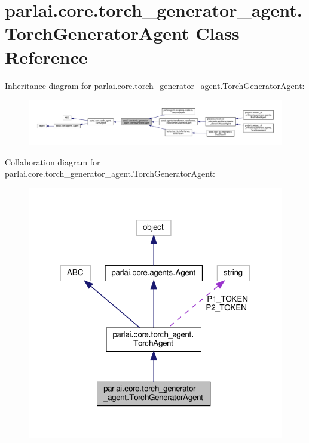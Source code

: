 \hypertarget{classparlai_1_1core_1_1torch__generator__agent_1_1TorchGeneratorAgent}{}\section{parlai.\+core.\+torch\+\_\+generator\+\_\+agent.\+Torch\+Generator\+Agent Class Reference}
\label{classparlai_1_1core_1_1torch__generator__agent_1_1TorchGeneratorAgent}


Inheritance diagram for parlai.\+core.\+torch\+\_\+generator\+\_\+agent.\+Torch\+Generator\+Agent\+:
\nopagebreak
\begin{figure}[H]
\begin{center}
\leavevmode
\includegraphics[width=350pt]{df/d9f/classparlai_1_1core_1_1torch__generator__agent_1_1TorchGeneratorAgent__inherit__graph}
\end{center}
\end{figure}


Collaboration diagram for parlai.\+core.\+torch\+\_\+generator\+\_\+agent.\+Torch\+Generator\+Agent\+:
\nopagebreak
\begin{figure}[H]
\begin{center}
\leavevmode
\includegraphics[width=318pt]{d5/d12/classparlai_1_1core_1_1torch__generator__agent_1_1TorchGeneratorAgent__coll__graph}
\end{center}
\end{figure}
